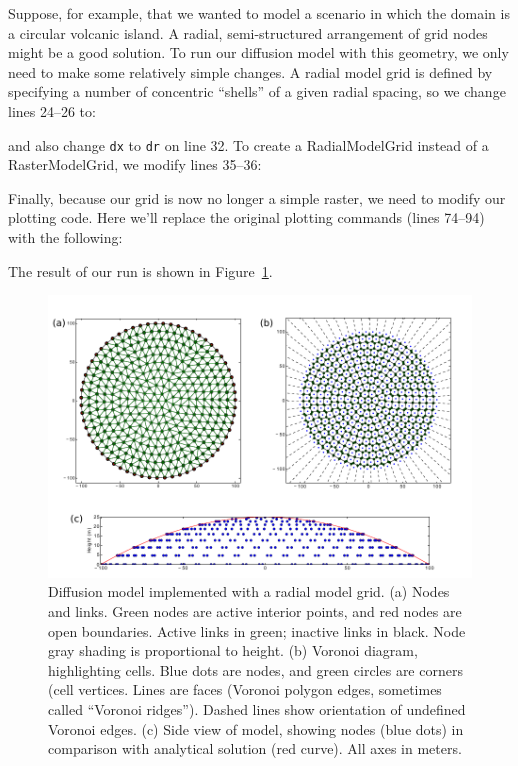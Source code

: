 \documentclass[12pt]{article}
\newcommand{\code}[1]{{\tt #1}}
\begin{document}
Suppose, for example, that we wanted to model a scenario in which the domain is a circular volcanic island. A radial, semi-structured arrangement of grid nodes might be a good solution. To run our diffusion model with this geometry, we only need to make some relatively simple changes. A radial model grid is defined by specifying a number of concentric ``shells'' of a given radial spacing, so we change lines 24--26 to:


and also change \code{dx} to \code{dr} on line 32. To create a RadialModelGrid instead of a RasterModelGrid, we modify lines 35--36:


Finally, because our grid is now no longer a simple raster, we need to modify our plotting code. Here we'll replace the original plotting commands (lines 74--94) with the following:


The result of our run is shown in Figure~\ref{radialdiffusion}.

 \begin{figure}[h!]
    \centering
    \includegraphics{radial_example.pdf}
    \caption{Diffusion model implemented with a radial model grid. (a) Nodes and links. Green nodes are active interior points, and red nodes are open boundaries. Active links in green; inactive links in black. Node gray shading is proportional to height. (b) Voronoi diagram, highlighting cells. Blue dots are nodes, and green circles are corners (cell vertices. Lines are faces (Voronoi polygon edges, sometimes called ``Voronoi ridges''). Dashed lines show orientation of undefined Voronoi edges. (c) Side view of model, showing nodes (blue dots) in comparison with analytical solution (red curve). All axes in meters.}
   \label{radialdiffusion}
\end{figure}
\end{document}
